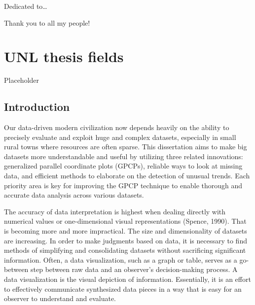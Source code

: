 \documentclass[print]{nuthesis}
\begin{document}
\begin{dedication}
Dedicated to\ldots{}
\end{dedication}

\begin{acknowledgments}
Thank you to all my people!
\end{acknowledgments}


\tableofcontents

\listoffigures
\listoftables

\mainmatter


\hypertarget{unl-thesis-fields}{%
\chapter{UNL thesis fields}\label{unl-thesis-fields}}

Placeholder

\hypertarget{introduction}{%
\section{Introduction}\label{introduction}}

Our data-driven modern civilization now depends heavily on the ability to precisely evaluate and exploit huge and complex datasets, especially in small rural towns where resources are often sparse.
This dissertation aims to make big datasets more understandable and useful by utilizing three related innovations: generalized parallel coordinate plots (GPCPs), reliable ways to look at missing data, and efficient methods to elaborate on the detection of unusual trends.
Each priority area is key for improving the GPCP technique to enable thorough and accurate data analysis across various datasets.

The accuracy of data interpretation is highest when dealing directly with numerical values or one-dimensional visual representations (Spence, 1990).
That is becoming more and more impractical. The size and dimensionality of datasets are increasing.
In order to make judgments based on data, it is necessary to find methods of simplifying and consolidating datasets without sacrificing significant information.
Often, a data visualization, such as a graph or table, serves as a go-between step between raw data and an observer's decision-making process. A data visualization is the visual depiction of information.
Essentially, it is an effort to effectively communicate synthesized data pieces in a way that is easy for an observer to understand and evaluate.
\end{document}
